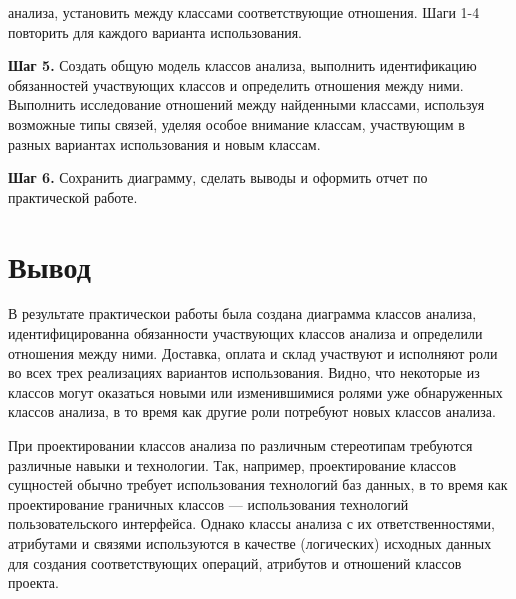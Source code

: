 \begin{enumerate}
		анализа, установить между классами соответствующие отношения.
		Шаги 1-4 повторить для каждого варианта использования.\par
		\textbf{Шаг 5.} Создать общую модель классов анализа,
		выполнить идентификацию обязанностей участвующих классов и
		определить отношения между ними. Выполнить исследование отношений
		между найденными классами, используя возможные типы связей,
		уделяя особое внимание классам, участвующим в разных вариантах
		использования и новым классам.\par
		\textbf{Шаг 6.} Сохранить диаграмму, сделать выводы и оформить
		отчет по практической работе.\par
\end{enumerate}

\newpage

\section*{\LARGE Вывод}
В результате практическои работы была создана диаграмма классов анализа,
идентифицированна обязанности участвующих классов анализа и определили
отношения между ними. Доставка, оплата и склад участвуют и
исполняют роли во всех трех реализациях вариантов использования. Видно,
что некоторые из классов могут оказаться новыми или изменившимися ролями
уже обнаруженных классов анализа, в то время как другие роли потребуют
новых классов анализа.\par
При проектировании классов анализа по различным стереотипам требуются
различные навыки и технологии. Так, например, проектирование классов
сущностей обычно требует использования технологий баз данных, в то время
как проектирование граничных классов — использования технологий
пользовательского интерфейса. Однако классы анализа с их ответственностями,
атрибутами и связями используются в качестве (логических) исходных данных
для создания соответствующих операций, атрибутов и отношений классов
проекта.
